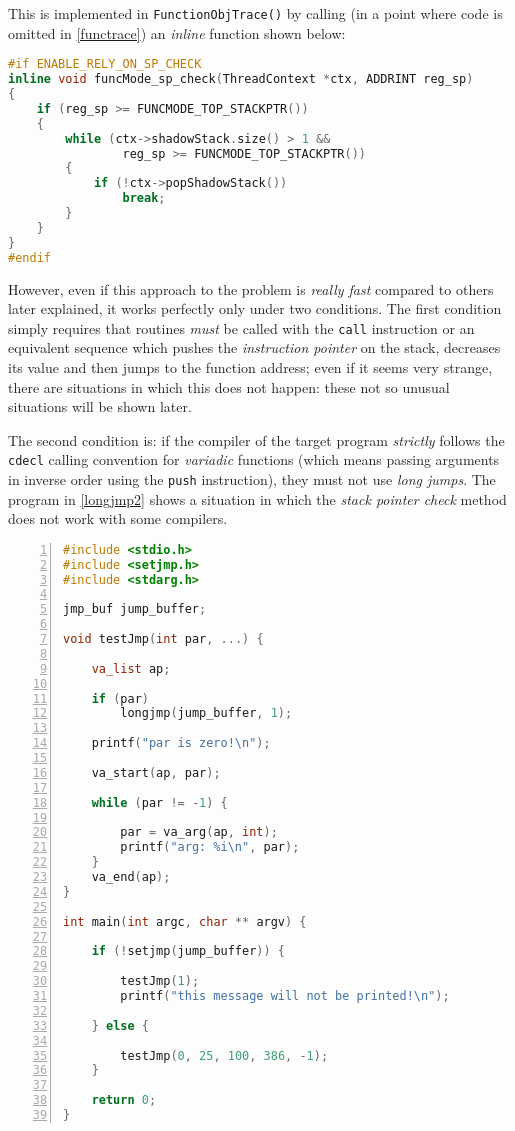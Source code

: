 \documentclass[a4paper,10pt]{report}
\begin{document}
This is implemented in \verb|FunctionObjTrace()| by calling
(in a point where code is omitted in \cref{functrace})
an \emph{inline} function shown below:

\begin{lstlisting}[language=C++,
	caption={implementation of \texttt{funcMode\_sp\_check()}},
	label=spcheck, frame=leftline, showstringspaces=false]
#if ENABLE_RELY_ON_SP_CHECK
inline void funcMode_sp_check(ThreadContext *ctx, ADDRINT reg_sp)
{
	if (reg_sp >= FUNCMODE_TOP_STACKPTR())
	{
		while (ctx->shadowStack.size() > 1 &&
				reg_sp >= FUNCMODE_TOP_STACKPTR())
		{
			if (!ctx->popShadowStack())
				break;
		}
	}
}
#endif
\end{lstlisting}

However, even if this approach to the problem is \emph{really fast} compared to others
later explained, it works perfectly only under two conditions.
The first condition simply requires that routines \emph{must} be called with the \verb|call| instruction or an equivalent sequence which pushes the \emph{instruction pointer}
on the stack, decreases its value and then jumps to the function address; even if it seems very strange, there are situations in which this does not happen: these not so unusual situations will be shown later.

The second condition is: if the compiler of the target program \emph{strictly}
follows the \verb|cdecl| calling convention for \emph{variadic} functions
(which means passing arguments in inverse order using the \verb|push| instruction),
they must not use \emph{long jumps}. The program in \cref{longjmp2} shows
a situation in which the \emph{stack pointer check} method
does not work with some compilers.

\begin{lstlisting}[language=C++,
	caption={source code of \texttt{prog8.c}},
	label=longjmp2, frame=leftline, numbers=left, showstringspaces=false]
#include <stdio.h>
#include <setjmp.h>
#include <stdarg.h>

jmp_buf jump_buffer;

void testJmp(int par, ...) {

	va_list ap;

	if (par)
		longjmp(jump_buffer, 1);

	printf("par is zero!\n");

	va_start(ap, par);

	while (par != -1) {

		par = va_arg(ap, int);
		printf("arg: %i\n", par);
	}
	va_end(ap);
}

int main(int argc, char ** argv) {

	if (!setjmp(jump_buffer)) {

		testJmp(1);
		printf("this message will not be printed!\n");

	} else {

		testJmp(0, 25, 100, 386, -1);
	}

	return 0;
}
\end{lstlisting}
\end{document}
